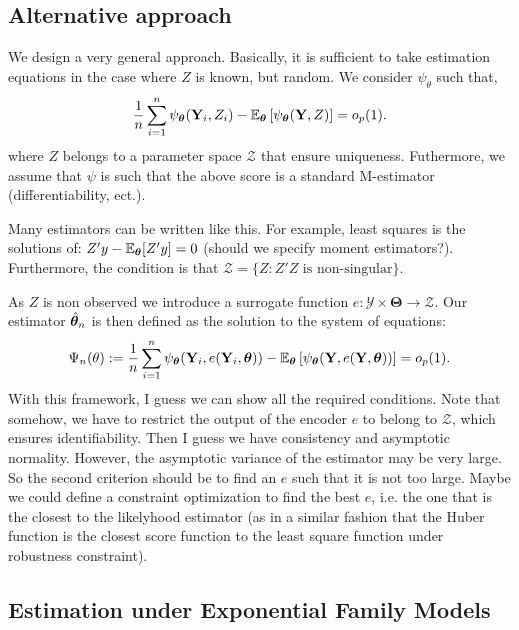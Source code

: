 \documentclass[twoside,11pt]{article}
\begin{document}
\subsection{Alternative approach}

We design a very general approach. Basically, it is sufficient to take estimation equations in the case where $Z$ is known, but random.
We consider $\psi_\theta$ such that,
\begin{equation}
\frac{1}{n} \sum_{i=1}^n \psi_{\bm{\theta}}({\bf Y}_i, Z_i) -
\mathbb{E}_{\bm{\theta}}
\left[ 
\psi_{\bm{\theta}}({\bf Y}, Z ) 
\right] = o_p(1).
\end{equation}
where $Z$ belongs to a parameter space $\mathcal{Z}$ that ensure uniqueness.
Futhermore, we assume that $\psi$ is such that the above score is a standard M-estimator (differentiability, ect.).

Many estimators can be written like this. 
For example, least squares is the solutions of: $Z'y - \mathbb{E}_{\bm{\theta}}[Z'y]= 0$ (should we specify moment estimators?).
Furthermore, the condition is that $\mathcal{Z}= \{ Z: Z'Z \text{ is non-singular} \}$.

As $Z$ is non observed we introduce a surrogate function
$e : \mathcal{Y} \times \bm{\Theta} \to \mathcal{Z}$.
Our estimator $\hat{{\bm{\theta}}}_n$ is then defined as the solution to the system of equations:
\begin{equation}
\Psi_n(\theta) := \frac{1}{n} \sum_{i=1}^n \psi_{\bm{\theta}}({\bf Y}_i, e({\bf Y}_i, {\bm{\theta}})) 
-
\mathbb{E}_{\bm{\theta}}
\left[ 
\psi_{\bm{\theta}}({\bf Y}, e({\bf Y}, {\bm{\theta}})) 
\right] = o_p(1).
\end{equation}
{\color{red} With this framework, I guess we can show all the required conditions.
Note that somehow, we have to restrict the output of the encoder $e$ to belong to $\mathcal{Z}$, which ensures identifiability.
}
Then I guess we have consistency and asymptotic normality.
However, the asymptotic variance of the estimator may be very large.
So the second criterion should be to find an $e$ such that it is not too large.
Maybe we could define a constraint optimization to find the best $e$, i.e. the one that is the closest to the likelyhood estimator (as in a similar fashion that the Huber function is the closest score function to the least square function under robustness constraint).


\subsection{Estimation under Exponential Family Models}
\label{sct:exponential-family}
\end{document}
